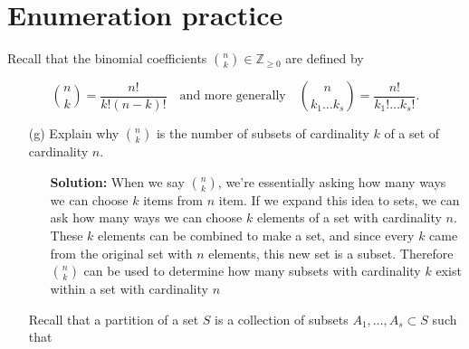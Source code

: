 \documentclass[hidelinks]{article}
\begin{document}
\section*{Enumeration practice}
Recall that the binomial coefficients $\binom{n}{k} \in \mathbb{Z}_{\geq 0}$ are defined by

$$\binom{n}{k} = \frac{n!}{k!(n-k)!} \quad \text{and more generally} \quad \binom{n}{k_1 \ldots k_s} = \frac{n!}{k_1! \ldots k_s!}.$$





\begin{itemize}
    \item[(g)]  Explain why $\binom{n}{k}$ is the number of subsets of cardinality $k$ of a set of cardinality $n$.
    \begin{itemize}
        \item[ ] \textbf{Solution:} When we say $\binom{n}{k}$, we're essentially asking how many ways we can choose $k$ items from $n$ item. If we expand this idea to sets, we can ask how many ways we can choose $k$ elements of a set with cardinality $n$. These $k$ elements can be combined to make a set, and since every $k$ came from the original set with $n$ elements, this new set is a subset. Therefore $\binom{n}{k}$ can be used to determine how many subsets with cardinality $k$ exist within a set with cardinality $n$

    \end{itemize}
Recall that a partition of a set $S$ is a collection of subsets $A_1, \ldots, A_s \subset S$ such that


\end{itemize}
\end{document}
